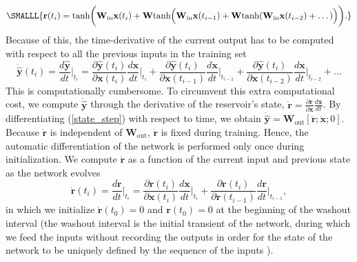 \documentclass[runningheads]{llncs}
\begin{document}
\begin{equation}
\label{exp_state}
\SMALLL{
     \textbf{r}(t_i) = \textrm{tanh}{\bigg(}\mathbf{W}_{\mathrm{in}}\mathbf{x}(t_i)+\mathbf{W}\textrm{tanh}{\Big (}\mathbf{W}_{\mathrm{in}}\mathbf{x}(t_{i-1})+\mathbf{W}\textrm{tanh}(\mathbf{W}_{\mathrm{in}}\mathbf{x}(t_{i-2})+\dots){\Big)}{\bigg)}.
     }
\end{equation}
Because of this, the  time-derivative of the current output has to be computed with respect to all the previous inputs in the training set
\begin{equation}
\mathbf{\dot{\hat{y}}}(t_i) = \frac{d\mathbf{\hat{y}}}{dt}{\bigg |}_{t_i} = \frac{\partial\mathbf{\hat{y}}(t_i)}{\partial \textbf{x}(t_i)}\frac{d\textbf{x}}{dt}{\bigg |}_{t_i} + \frac{\partial\mathbf{\hat{y}}(t_i)}{\partial \textbf{x}(t_{i-1})}\frac{d\textbf{x}}{dt}{\bigg |}_{t_{i-1}} + \frac{\partial\mathbf{\hat{y}}(t_i)}{\partial \textbf{x}(t_{i-2})}\frac{d\textbf{x}}{dt}{\bigg |}_{t_{i-2}} + \ldots
\end{equation}
This is computationally cumbersome. To circumvent this extra computational cost, we compute $\mathbf{\dot{\hat{y}}}$ through the derivative of the reservoir's state, $\mathbf{\dot{r}}=\frac{\partial\mathbf{r}}{\partial \mathbf{x}}\frac{d\mathbf{x}}{dt}$. By differentiating (\ref{state_step}) with respect to time, we obtain 
$
  \mathbf{\dot{\hat{y}}} = \mathbf{W}_{\mathrm{out}}[\mathbf{\dot{r}};\mathbf{\dot{x}};0]
$. Because $\mathbf{\dot{r}}$ is independent of $\mathbf{W}_{\mathrm{out}}$, $\mathbf{\dot{r}}$ is fixed during training. Hence, the automatic differentiation of the network is performed only once during initialization. We compute $\mathbf{\dot{r}}$ as a function of the current input and previous state as the network evolves
\begin{equation}
\mathbf{\dot{r}}(t_i) = \frac{d\mathbf{r}}{dt}{\bigg |}_{t_i} =
\frac{\partial\mathbf{r}(t_i)}{\partial \mathbf{x}(t_i)}\frac{d\mathbf{x}}{dt}{\bigg |}_{t_i} + \frac{\partial\mathbf{r}(t_i)}{\partial \mathbf{r}(t_{i-1})}\frac{d\mathbf{r}}{dt}{\bigg |}_{t_{i-1}},
\end{equation}
in which we initialize $\mathbf{\dot{r}}(t_0)=0$ and $\mathbf{r}(t_0)=0$ at the beginning of the washout interval (the washout interval is the initial transient of the network, during which we feed the inputs without recording the outputs in order for the state of the network to be uniquely defined by the sequence of the inputs \cite{lukovsevivcius2012practical}). 
\end{document}
